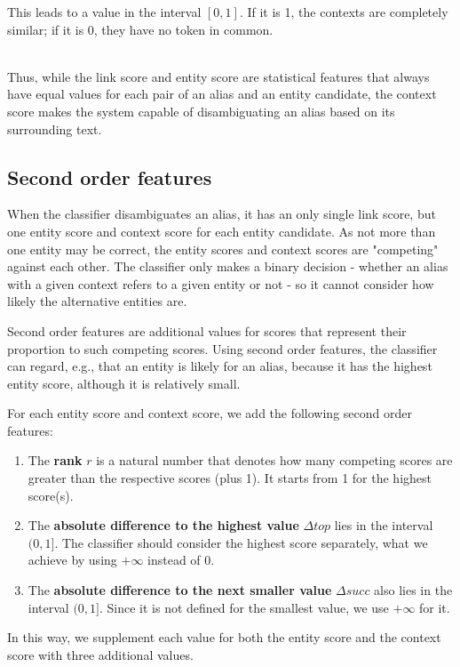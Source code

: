 This leads to a value in the interval $[0, 1]$. If it is 1, the contexts are completely similar; if it is 0, they have no token in common.

~\\
Thus, while the link score and entity score are statistical features that always have equal values for each pair of an alias and an entity candidate, the context score makes the system capable of disambiguating an alias based on its surrounding text.



\subsection{Second order features}
When the classifier disambiguates an alias, it has an only single link score, but one entity score and context score for each entity candidate. As not more than one entity may be correct, the entity scores and context scores are "competing" against each other. The classifier only makes a binary decision - whether an alias with a given context refers to a given entity or not - so it cannot consider how likely the alternative entities are.

Second order features are additional values for scores that represent their proportion to such competing scores. Using second order features, the classifier can regard, e.g., that an entity is likely for an alias, because it has the highest entity score, although it is relatively small.

For each entity score and context score, we add the following second order features:

\begin{enumerate}
\item The \textbf{rank} $r$ is a natural number that denotes how many competing scores are greater than the respective scores (plus 1). It starts from 1 for the highest score(s).

\item The \textbf{absolute difference to the highest value} $\Delta top$ lies in the interval $(0, 1]$. The classifier should consider the highest score separately, what we achieve by using $+\infty$ instead of 0.

\item The \textbf{absolute difference to the next smaller value} $\Delta succ$ also lies in the interval $(0, 1]$. Since it is not defined for the smallest value, we use $+\infty$ for it.
\end{enumerate}

In this way, we supplement each value for both the entity score and the context score with three additional values.